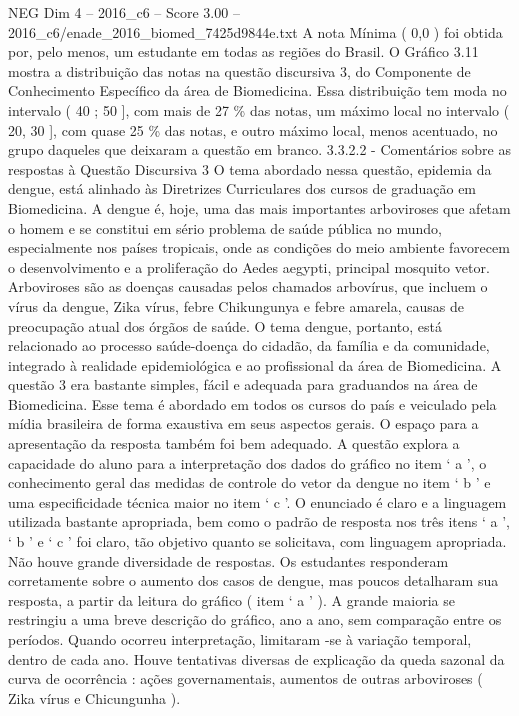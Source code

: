 \begin{textsample}{NEG Dim 4 – 2016\_c6 – Score 3.00 – 2016\_c6/enade\_2016\_biomed\_7425d9844e.txt}
A nota Mínima ( 0,0 ) foi obtida por, pelo menos, um estudante em todas as regiões do Brasil.
O Gráfico 3.11 mostra a distribuição das notas na questão discursiva 3, do Componente de Conhecimento Específico da área de Biomedicina.
Essa distribuição tem moda no intervalo ( 40 ; 50 ], com mais de 27 \% das notas, um máximo local no intervalo ( 20, 30 ], com quase 25 \% das notas, e outro máximo local, menos acentuado, no grupo daqueles que deixaram a questão em branco. 3.3.2.2 - Comentários sobre as respostas à Questão Discursiva 3 O tema abordado nessa questão, epidemia da dengue, está alinhado às Diretrizes Curriculares dos cursos de graduação em Biomedicina.
A dengue é, hoje, uma das mais importantes arboviroses que afetam o homem e se constitui em sério problema de saúde pública no mundo, especialmente nos países tropicais, onde as condições do meio ambiente favorecem o desenvolvimento e a proliferação do Aedes aegypti, principal mosquito vetor.
Arboviroses são as doenças causadas pelos chamados arbovírus, que incluem o vírus da dengue, Zika vírus, febre Chikungunya e febre amarela, causas de preocupação atual dos órgãos de saúde.
O tema dengue, portanto, está relacionado ao processo saúde-doença do cidadão, da família e da comunidade, integrado à realidade epidemiológica e ao profissional da área de Biomedicina.
A questão 3 era bastante simples, fácil e adequada para graduandos na área de Biomedicina.
Esse tema é abordado em todos os cursos do país e veiculado pela mídia brasileira de forma exaustiva em seus aspectos gerais.
O espaço para a apresentação da resposta também foi bem adequado.
A questão explora a capacidade do aluno para a interpretação dos dados do gráfico no item ‘ a ’, o conhecimento geral das medidas de controle do vetor da dengue no item ‘ b ’ e uma especificidade técnica maior no item ‘ c ’.
O enunciado é claro e a linguagem utilizada bastante apropriada, bem como o padrão de resposta nos três itens ‘ a ’, ‘ b ’ e ‘ c ’ foi claro, tão objetivo quanto se solicitava, com linguagem apropriada.
Não houve grande diversidade de respostas.
Os estudantes responderam corretamente sobre o aumento dos casos de dengue, mas poucos detalharam sua resposta, a partir da leitura do gráfico ( item ‘ a ’ ).
A grande maioria se restringiu a uma breve descrição do gráfico, ano a ano, sem comparação entre os períodos.
Quando ocorreu interpretação, limitaram -se à variação temporal, dentro de cada ano.
Houve tentativas diversas de explicação da queda sazonal da curva de ocorrência : ações governamentais, aumentos de outras arboviroses ( Zika vírus e Chicungunha ).

\end{textsample}
